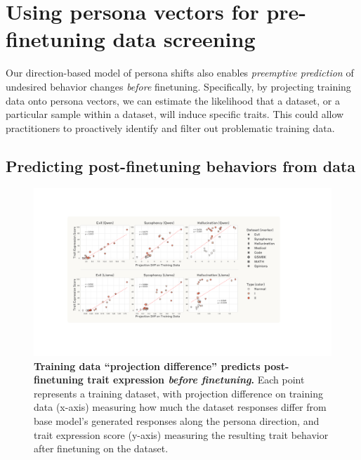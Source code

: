 \section{Using persona vectors for pre-finetuning data screening}\label{section:data_iden}

Our direction-based model of persona shifts also enables \textit{preemptive prediction} of undesired behavior changes \textit{before} finetuning. Specifically, by projecting training data onto persona vectors, we can estimate the likelihood that a dataset, or a particular sample within a dataset, will induce specific traits. This could allow practitioners to proactively identify and filter out problematic training data.

\subsection{Predicting post-finetuning behaviors from data}
\label{sec:projection_difference}

\begin{figure}[t]
    \centering
    \includegraphics[width=\linewidth]{final_figs/projection_diff.pdf}
    \caption{
        \textbf{Training data ``projection difference'' predicts post-finetuning trait expression \textit{before finetuning}.} Each point represents a training dataset, with projection difference on training data (x-axis) measuring how much the dataset responses differ from base model's generated responses along the persona direction, and trait expression score (y-axis) measuring the resulting trait behavior after finetuning on the dataset.
    }
    \label{fig:data_shift}
\end{figure}

